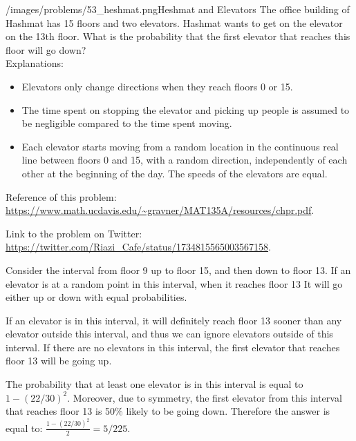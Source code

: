 \begin{problem}{/images/problems/53_heshmat.png}{Heshmat and Elevators}  The office building of Hashmat has 15 floors and two elevators. Hashmat wants to get on the elevator on the 13th floor. What is the probability that the first elevator that reaches this floor will go down?\\[0.2cm]
	
Explanations:
\begin{itemize}
	\item Elevators only change directions when they reach floors 0 or 15.
	\item The time spent on stopping the elevator and picking up people is assumed to be negligible compared to the time spent moving.
	\item Each elevator starts moving from a random location in the continuous real line between floors 0 and 15, with a random direction, independently of each other at the beginning of the day. The speeds of the elevators are equal.
\end{itemize}
	
Reference of this problem: \url{https://www.math.ucdavis.edu/~gravner/MAT135A/resources/chpr.pdf}.

Link to the problem on Twitter: \url{https://twitter.com/Riazi_Cafe/status/1734815565003567158}.
\end{problem}
\begin{solution}
	Consider the interval from floor 9 up to floor 15, and then down to floor 13. If an elevator is at a random point in this interval, when it reaches floor 13 It will go either up or down with equal probabilities.
	
	If an elevator is in this interval, it will definitely reach floor 13 sooner than any elevator outside this interval, and thus we can ignore elevators outside of this interval. If there are no elevators in this interval, the first elevator that reaches floor 13 will be going up.
	
	The probability that at least one elevator is in this interval is equal to 
	$1-(22/30)^2$.
	Moreover, due to symmetry, the first elevator from this interval that reaches floor 13 is 50\% likely to be going down. Therefore the answer is equal to:
	$\frac{1-(22/30)^2}{2} = 5/225.$
\end{solution}
